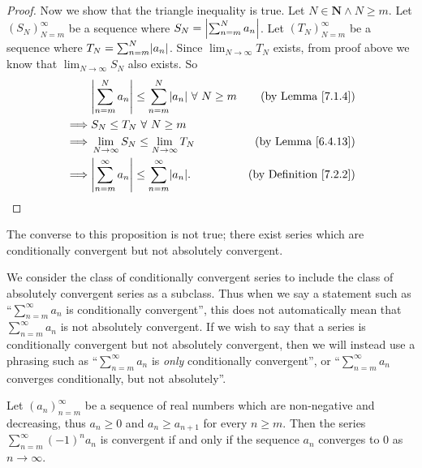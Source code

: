 \begin{proof}
    Now we show that the triangle inequality is true.
    Let \(N \in \mathbf{N} \land N \geq m\).
    Let \((S_N)_{N = m}^\infty\) be a sequence where \(S_N = \abs*{\sum_{n = m}^N a_n}\).
    Let \((T_N)_{N = m}^\infty\) be a sequence where \(T_N = \sum_{n = m}^N \abs*{a_n}\).
    Since \(\lim_{N \to \infty} T_N\) exists, from proof above we know that \(\lim_{N \to \infty} S_N\) also exists.
    So
    \begin{align*}
                 & \abs*{\sum_{n = m}^N a_n} \leq \sum_{n = m}^N \abs*{a_n} \ \forall\ N \geq m & \text{(by Lemma \ref{7.1.4})}      \\
        \implies & S_N \leq T_N \ \forall\ N \geq m                                                                                  \\
        \implies & \lim_{N \to \infty} S_N \leq \lim_{N \to \infty} T_N                         & \text{(by Lemma \ref{6.4.13})}     \\
        \implies & \abs*{\sum_{n = m}^\infty a_n} \leq \sum_{n = m}^\infty \abs*{a_n}.          & \text{(by Definition \ref{7.2.2})}
    \end{align*}
\end{proof}

\begin{remark}\label{7.2.10}
    The converse to this proposition is not true;
    there exist series which are conditionally convergent but not absolutely convergent.
\end{remark}

\begin{remark}\label{7.2.11}
    We consider the class of conditionally convergent series to include the class of absolutely convergent series as a subclass.
    Thus when we say a statement such as ``\(\sum_{n = m}^\infty a_n\) is conditionally convergent'', this does not automatically mean that \(\sum_{n = m}^\infty a_n\) is not absolutely convergent.
    If we wish to say that a series is conditionally convergent but not absolutely convergent, then we will instead use a phrasing such as ``\(\sum_{n = m}^\infty a_n\) is \emph{only} conditionally convergent'', or ``\(\sum_{n = m}^\infty a_n\) converges conditionally, but not absolutely''.
\end{remark}

\begin{proposition}\label{7.2.12}
    Let \((a_n)_{n = m}^\infty\) be a sequence of real numbers which are non-negative and decreasing, thus \(a_n \geq 0\) and \(a_n \geq a_{n + 1}\) for every \(n \geq m\).
    Then the series \(\sum_{n = m}^\infty (-1)^n a_n\) is convergent if and only if the sequence \(a_n\) converges to \(0\) as \(n \to \infty\).
\end{proposition}

